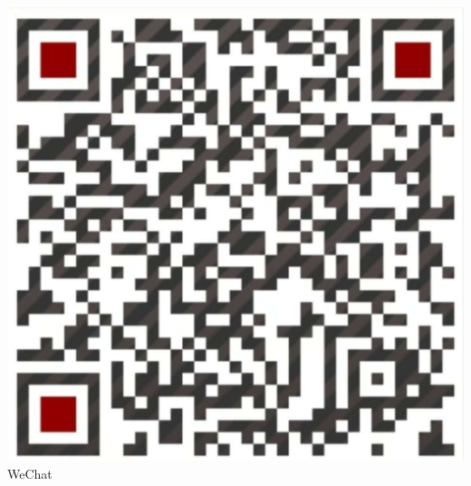 \documentclass[a4paper]{deedy-resume} %
\begin{document}
\begin{minipage}[t]{0.33\textwidth}
\vspace{\topsep} %

\includegraphics[scale=0.1]{wechat} \\
\quad \quad \quad \quad WeChat

\sectionspace %


\end{minipage} %
\hfill
%
%
\end{document}
